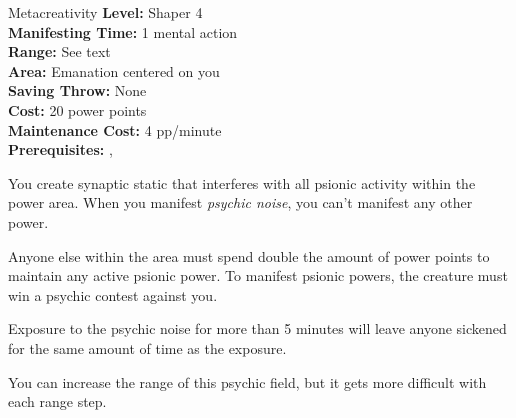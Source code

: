 {Metacreativity}
{
	\textbf{Level:}
	Shaper 4\\
	\textbf{Manifesting Time:}
	1 mental action\\
	\textbf{Range:}
	See text\\
	\textbf{Area:}
	Emanation centered on you\\
	\textbf{Saving Throw:}
	None\\
	\textbf{Cost:}
	20 power points\\
	\textbf{Maintenance Cost:}
	4 pp/minute\\
	\textbf{Prerequisites:}
	, \\
}
{
	You create synaptic static that interferes with all psionic activity within the power area. When you manifest \emph{psychic noise}, you can't manifest any other power.

	Anyone else within the area must spend double the amount of power points to maintain any active psionic power. To manifest psionic powers, the creature must win a psychic contest against you.

	Exposure to the psychic noise for more than 5 minutes will leave anyone sickened for the same amount of time as the exposure. %
	
	You can increase the range of this psychic field, but it gets more difficult with each range step.

}
